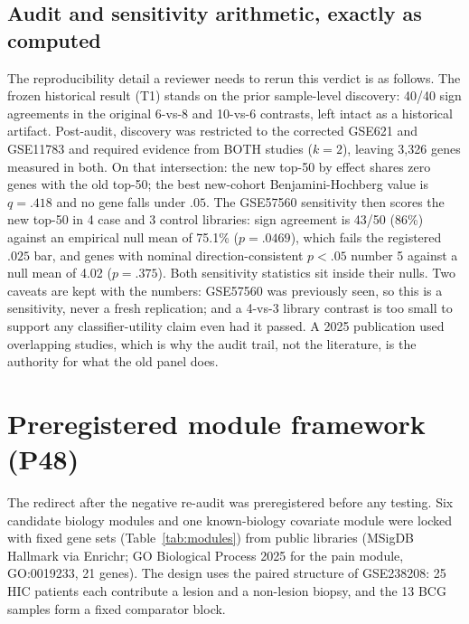 \documentclass[11pt,a4paper]{article}
\begin{document}
\subsection{Audit and sensitivity arithmetic, exactly as computed}
The reproducibility detail a reviewer needs to rerun this verdict is as
follows. The frozen historical result (T1) stands on the prior sample-level
discovery: 40/40 sign agreements in the original 6-vs-8 and 10-vs-6 contrasts,
left intact as a historical artifact. Post-audit, discovery was restricted to
the corrected GSE621 and GSE11783 and required evidence from BOTH studies
($k=2$), leaving 3{,}326 genes measured in both. On that intersection: the new
top-50 by effect shares zero genes with the old top-50; the best new-cohort
Benjamini-Hochberg value is $q=.418$ and no gene falls under $.05$. The
GSE57560 sensitivity then scores the new top-50 in 4 case and 3 control
libraries: sign agreement is 43/50 (86\%) against an empirical null mean of
75.1\% ($p=.0469$), which fails the registered $.025$ bar, and genes with
nominal direction-consistent $p<.05$ number 5 against a null mean of 4.02
($p=.375$). Both sensitivity statistics sit inside their nulls. Two caveats
are kept with the numbers: GSE57560 was previously seen, so this is a
sensitivity, never a fresh replication; and a 4-vs-3 library contrast is too
small to support any classifier-utility claim even had it passed. A 2025
publication used overlapping studies, which is why the audit trail, not the
literature, is the authority for what the old panel does.

\section{Preregistered module framework (P48)}
\label{sec:framework}
The redirect after the negative re-audit was preregistered before any testing.
Six candidate biology modules and one known-biology covariate module were locked
with fixed gene sets (Table~\ref{tab:modules}) from public libraries (MSigDB
Hallmark via Enrichr; GO Biological Process 2025 for the pain module,
GO:0019233, 21 genes). The design uses the paired structure of GSE238208: 25
HIC patients each contribute a lesion and a non-lesion biopsy, and the 13 BCG
samples form a fixed comparator block.
\end{document}
